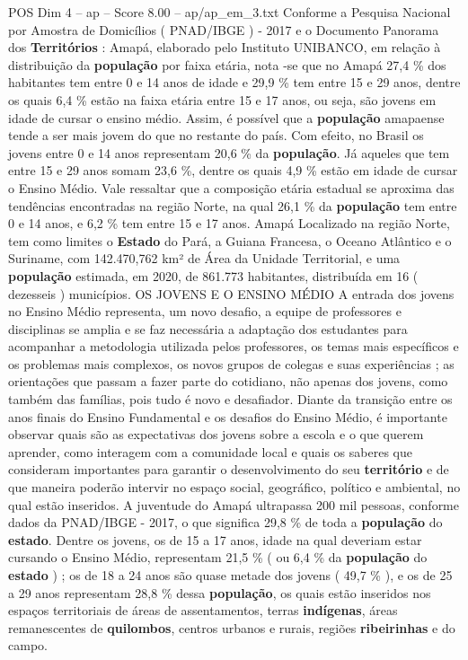\begin{textsample}{POS Dim 4 – ap – Score 8.00 – ap/ap\_em\_3.txt}  \label{ex:f4_pos_237}
Conforme a Pesquisa Nacional por Amostra de Domicílios ( PNAD/IBGE ) - 2017 e o Documento Panorama dos \textbf{Territórios} : Amapá, elaborado pelo Instituto UNIBANCO, em relação à distribuição da \textbf{população} por faixa etária, nota -se que no Amapá 27,4 \% dos habitantes tem entre 0 e 14 anos de idade e 29,9 \% tem entre 15 e 29 anos, dentre os quais 6,4 \% estão na faixa etária entre 15 e 17 anos, ou seja, são jovens em idade de cursar o ensino médio.
Assim, é possível que a \textbf{população} amapaense tende a ser mais jovem do que no restante do país.
Com efeito, no Brasil os jovens entre 0 e 14 anos representam 20,6 \% da \textbf{população}.
Já aqueles que tem entre 15 e 29 anos somam 23,6 \%, dentre os quais 4,9 \% estão em idade de cursar o Ensino Médio.
Vale ressaltar que a composição etária estadual se aproxima das tendências encontradas na região Norte, na qual 26,1 \% da \textbf{população} tem entre 0 e 14 anos, e 6,2 \% tem entre 15 e 17 anos.
Amapá Localizado na região Norte, tem como limites o \textbf{Estado} do Pará, a Guiana Francesa, o Oceano Atlântico e o Suriname, com 142.470,762 km² de Área da Unidade Territorial, e uma \textbf{população} estimada, em 2020, de 861.773 habitantes, distribuída em 16 ( dezesseis ) municípios.
OS JOVENS E O ENSINO MÉDIO A entrada dos jovens no Ensino Médio representa, um novo desafio, a equipe de professores e disciplinas se amplia e se faz necessária a adaptação dos estudantes para acompanhar a metodologia utilizada pelos professores, os temas mais específicos e os problemas mais complexos, os novos grupos de colegas e suas experiências ; as orientações que passam a fazer parte do cotidiano, não apenas dos jovens, como também das famílias, pois tudo é novo e desafiador.
Diante da transição entre os anos finais do Ensino Fundamental e os desafios do Ensino Médio, é importante observar quais são as expectativas dos jovens sobre a escola e o que querem aprender, como interagem com a comunidade local e quais os saberes que consideram importantes para garantir o desenvolvimento do seu \textbf{território} e de que maneira poderão intervir no espaço social, geográfico, político e ambiental, no qual estão inseridos.
A juventude do Amapá ultrapassa 200 mil pessoas, conforme dados da PNAD/IBGE - 2017, o que significa 29,8 \% de toda a \textbf{população} do \textbf{estado}.
Dentre os jovens, os de 15 a 17 anos, idade na qual deveriam estar cursando o Ensino Médio, representam 21,5 \% ( ou 6,4 \% da \textbf{população} do \textbf{estado} ) ; os de 18 a 24 anos são quase metade dos jovens ( 49,7 \% ), e os de 25 a 29 anos representam 28,8 \% dessa \textbf{população}, os quais estão inseridos nos espaços territoriais de áreas de assentamentos, terras \textbf{indígenas}, áreas remanescentes de \textbf{quilombos}, centros urbanos e rurais, regiões \textbf{ribeirinhas} e do campo.

\end{textsample}
